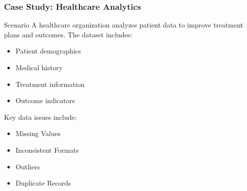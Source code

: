 \documentclass[aspectratio=169]{beamer}
\begin{document}
\begin{frame}[fragile]
    \frametitle{Case Study: Healthcare Analytics}
    \begin{block}{Scenario}
        A healthcare organization analyzes patient data to improve treatment plans and outcomes. The dataset includes:
        \begin{itemize}
            \item Patient demographics
            \item Medical history
            \item Treatment information
            \item Outcome indicators
        \end{itemize}
        Key data issues include:
        \begin{itemize}
            \item Missing Values
            \item Inconsistent Formats
            \item Outliers
            \item Duplicate Records
        \end{itemize}
    \end{block}
\end{frame}
\end{document}
